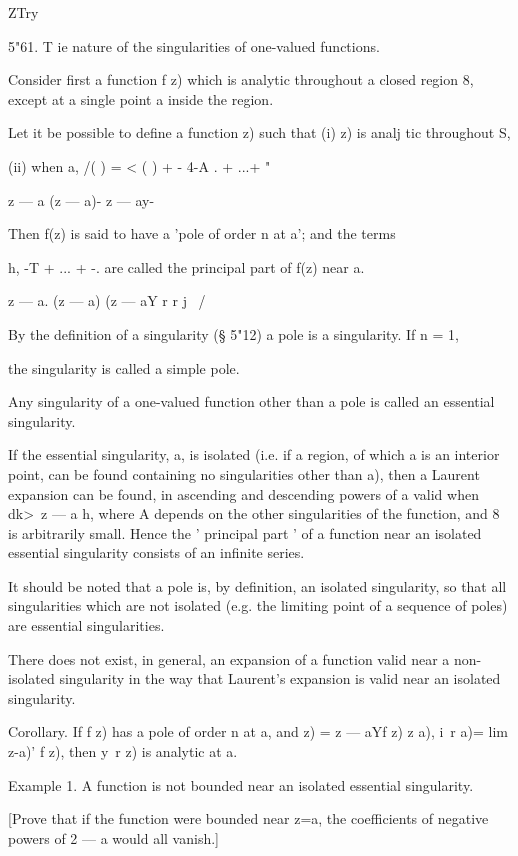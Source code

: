 {{{{ZTry

5"61. T ie nature of the singularities of one-valued functions.

Consider first a function f z) which is analytic throughout a closed
region 8, except at a single point a inside the region.

Let it be possible to define a function z) such that (i) z) is analj
tic throughout S,

(ii) when a, /( ) = < ( ) + - 4-A . + ...+ "

z — a (z — a)- z — ay-

Then f(z) is said to have a 'pole of order n at a'; and the terms

h, -T + ... + -. are called the principal part of f(z) near a.

z — a. (z — a) (z — aY r r j \ /

By the definition of a singularity (§ 5"12) a pole is a singularity.
If n = 1,

the singularity is called a simple pole.

Any singularity of a one-valued function other than a pole is called
an essential singularity.

If the essential singularity, a, is isolated (i.e. if a region, of
which a is an interior point, can be found containing no singularities
other than a), then a Laurent expansion can be found, in ascending and
descending powers of a valid when dk>\ z — a h, where A depends on the
other singularities of the function, and 8 is arbitrarily small. Hence
the ' principal part ' of a function near an isolated essential
singularity consists of an infinite series.

It should be noted that a pole is, by definition, an isolated
singularity, so that all singularities which are not isolated (e.g.
the limiting point of a sequence of poles) are essential
singularities.

There does not exist, in general, an expansion of a function valid
near a non-isolated singularity in the way that Laurent's expansion is
valid near an isolated singularity.

Corollary. If f z) has a pole of order n at a, and z) = z — aYf z) z
a), i\ r a)= lim z-a)' f z), then y\ r z) is analytic at a.

Example 1. A function is not bounded near an isolated essential
singularity.

[Prove that if the function were bounded near z=a, the coefficients of
negative powers of 2 — a would all vanish.]

}}}}

